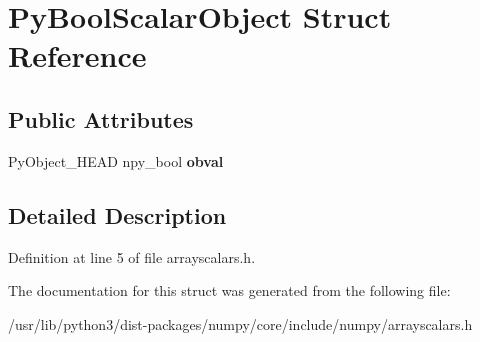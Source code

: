 \hypertarget{structPyBoolScalarObject}{}\section{Py\+Bool\+Scalar\+Object Struct Reference}
\label{structPyBoolScalarObject}
\subsection*{Public Attributes}
\begin{DoxyCompactItemize}
\item 
Py\+Object\+\_\+\+H\+E\+AD npy\+\_\+bool {\bfseries obval}\hypertarget{structPyBoolScalarObject_a5a0a26b1f60e58289812124abf5271f7}{}\label{structPyBoolScalarObject_a5a0a26b1f60e58289812124abf5271f7}

\end{DoxyCompactItemize}


\subsection{Detailed Description}


Definition at line 5 of file arrayscalars.\+h.



The documentation for this struct was generated from the following file\+:\begin{DoxyCompactItemize}
\item 
/usr/lib/python3/dist-\/packages/numpy/core/include/numpy/arrayscalars.\+h\end{DoxyCompactItemize}
